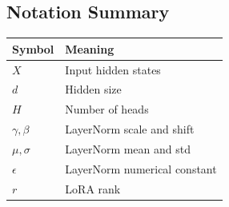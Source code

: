 \subsection{Notation Summary}

\begin{table}[H]
\centering
\small
\begin{tabular}{ll}
\toprule
\textbf{Symbol} & \textbf{Meaning} \\
\midrule
$X$ & Input hidden states \\
$d$ & Hidden size \\
$H$ & Number of heads \\
$\gamma, \beta$ & LayerNorm scale and shift \\
$\mu, \sigma$ & LayerNorm mean and std \\
$\epsilon$ & LayerNorm numerical constant \\
$r$ & LoRA rank \\
\bottomrule
\end{tabular}
\end{table}

